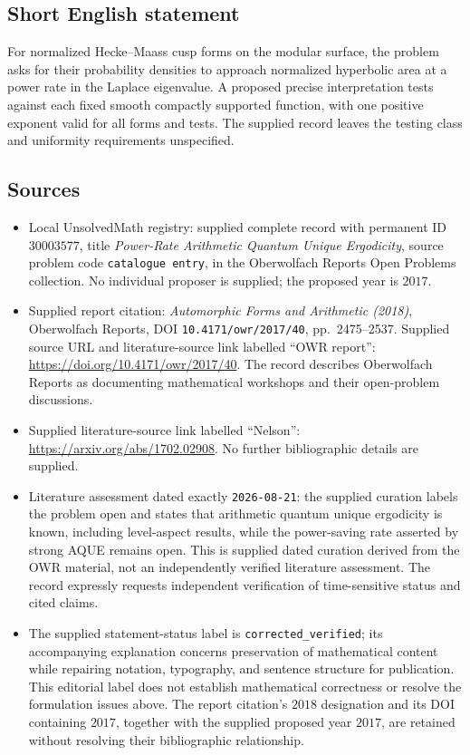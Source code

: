 \documentclass[11pt]{article}
\begin{document}
\subsection{Short English statement}
For normalized Hecke--Maass cusp forms on the modular surface, the problem asks for their probability densities to approach normalized hyperbolic area at a power rate in the Laplace eigenvalue. A proposed precise interpretation tests against each fixed smooth compactly supported function, with one positive exponent valid for all forms and tests. The supplied record leaves the testing class and uniformity requirements unspecified.
\subsection{Sources}
\begin{itemize}
\item Local UnsolvedMath registry: supplied complete record with permanent ID \(30003577\), title \emph{Power-Rate Arithmetic Quantum Unique Ergodicity}, source problem code \texttt{catalogue entry}, in the Oberwolfach Reports Open Problems collection. No individual proposer is supplied; the proposed year is \(2017\).
\item Supplied report citation: \emph{Automorphic Forms and Arithmetic (2018)}, Oberwolfach Reports, DOI \texttt{10.4171/owr/2017/40}, pp.\ 2475--2537. Supplied source URL and literature-source link labelled ``OWR report'': \url{https://doi.org/10.4171/owr/2017/40}. The record describes Oberwolfach Reports as documenting mathematical workshops and their open-problem discussions.
\item Supplied literature-source link labelled ``Nelson'': \url{https://arxiv.org/abs/1702.02908}. No further bibliographic details are supplied.
\item Literature assessment dated exactly \texttt{2026-08-21}: the supplied curation labels the problem open and states that arithmetic quantum unique ergodicity is known, including level-aspect results, while the power-saving rate asserted by strong AQUE remains open. This is supplied dated curation derived from the OWR material, not an independently verified literature assessment. The record expressly requests independent verification of time-sensitive status and cited claims.
\item The supplied statement-status label is \texttt{corrected\_verified}; its accompanying explanation concerns preservation of mathematical content while repairing notation, typography, and sentence structure for publication. This editorial label does not establish mathematical correctness or resolve the formulation issues above. The report citation's \(2018\) designation and its DOI containing \(2017\), together with the supplied proposed year \(2017\), are retained without resolving their bibliographic relationship.
\end{itemize}
\end{document}

